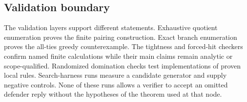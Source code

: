 \subsection{Validation boundary}

The validation layers support different statements.  Exhaustive quotient
enumeration proves the finite pairing construction.  Exact branch
enumeration proves the all-ties greedy counterexample.  The tightness and
forced-hit checkers confirm named finite calculations while their main
claims remain analytic or scope-qualified.  Randomized domination checks
test implementations of proven local rules.  Search-harness runs measure a
candidate generator and supply negative controls.  None of these runs allows
a verifier to accept an omitted defender reply without the hypotheses of the
theorem used at that node.
